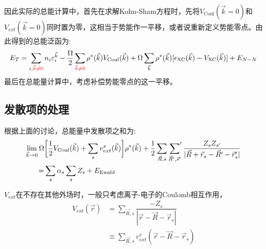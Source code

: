 \documentclass{article}      %
\begin{document}
因此实际的总能计算中，首先在求解\textrm{Kohn-Sham}方程时，先将$V_{\mathrm{Coul}}(\vec k=0)$和$V_{ext}(\vec k=0)$同时置为零，这相当于势能作一平移，或者说重新定义势能零点。由此得到的总能泛函为:~
\begin{equation}
	E_T=\sum_{i,\textcolor{red}{\vec k\neq0}}n_i\varepsilon_i^{\vec k}-\dfrac{\Omega}2\sum_{\textcolor{red}{\vec k\neq 0}}\rho^{\ast}(\vec k)V_{\mathrm{Coul}}(\vec k)+\Omega\sum_{\vec k}\rho^{\ast}(\vec k)[\epsilon_{\mathrm{XC}}(\vec k)-V_{\mathrm{XC}}(\vec k)]+E_{N-N}
	\label{eq:DFT_ENE_G-2}
\end{equation}
最后在总能量计算中，考虑补偿势能零点的这一平移。

\subsection{发散项的处理}
根据上面的讨论，总能量中发散项之和为:~
	\begin{equation}
		\begin{aligned}
			\lim_{\vec k\rightarrow0}\Omega&\bigg[\dfrac12V_{\mathrm{Coul}}(\vec k)+\sum_sv_{ext}^s(\vec k)\bigg]\rho^{\ast}(\vec k)+\dfrac12\sum_{\vec R,s}\sideset{}{^{\prime}}\sum_{\vec R^{\prime},\vec s^{\prime}}\dfrac{Z_sZ_{s^{\prime}}}{|\vec R+\vec r_s-\vec R^{\prime}-\vec r_s^{\prime}|}\\
			=&\sum_s\alpha_s\sum_sZ_s+E_{\mathrm{Ewald}}
		\end{aligned}
		\label{eq:diver-term}
	\end{equation}
	
$V_{ext}$在不存在其他外场时，一般只考虑离子-电子的\textrm{Coulomb}相互作用，
	\begin{equation}
		\begin{aligned}
			V_{ext}(\vec r)&=\sum_{\vec R,s}\dfrac{-Z_s}{|\vec r-\vec R-\vec r_s|}\\
			&\equiv\sum_{\vec R,s}v_{ext}^s(\vec r-\vec R-\vec r_s)
		\end{aligned}
		\label{eq:Ion-ele_Coulomb}
	\end{equation}
\end{document}
